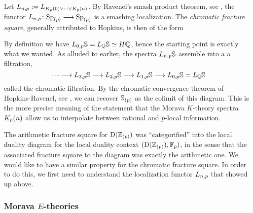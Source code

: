 \begin{construction}
    \label{ch0:const:chromatic-fracture-square}
    Let $L\np := L_{K_p(0)\vee \cdots \vee \Kpn}$. By Ravenel's smash product theorem, see \cite[7.5.6]{ravenel_92}, the functor $L\np\colon \Sp_{(p)}\longrightarrow \Sp_{(p)}$ is a smashing localization. The \emph{chromatic fracture square}, generally attributed to Hopkins, is then of the form 
    \begin{center}
    \end{center}
    By definition we have $L_{0,p} \S = L_\Q \S \simeq H\Q$, hence the starting point is exactly what we wanted. As alluded to earlier, the spectra $L\np\S$ assemble into a a filtration, 
    \[\cdots \longrightarrow L_{3,p}\S \longrightarrow L_{2,p}\S \longrightarrow L_{1,p}\S \longrightarrow L_{0,p} \S = L_\Q\S\]
    called the chromatic filtration. By the chromatic convergence theorem of Hopkins-Ravenel, see \cite[7.5.7]{ravenel_92}, we can recover $\S_{(p)}$ as the colimit of this diagram. This is the more precise meaning of the statement that the Morava $K$-theory spectra $\Kpn$ allow us to interpolate between rational and $p$-local information. 
\end{construction}

\begin{remark}
    \label{ch0:rm:chromatic-square-from-duality}
    The arithmetic fracture square for $\Der(\Z_{(p)})$ was ``categorified'' into the local duality diagram for the local duality context $(\Der(\Z_{(p)}), \F_p)$, in the sense that the associated fracture square to the diagram was exactly the arithmetic one. We would like to have a similar property for the chromatic fracture square. In order to do this, we first need to understand the localization functor $L\np$ that showed up above. 
\end{remark}  






\subsubsection{Morava \texorpdfstring{$E$}{E}-theories}
\label{ch0:sssec:morava-E-theories}

